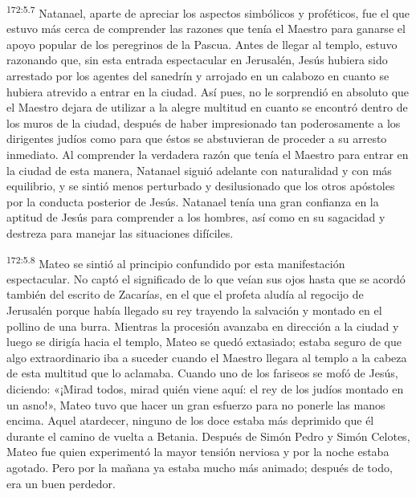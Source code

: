 \par
\textsuperscript{172:5.7} Natanael, aparte de apreciar los aspectos simbólicos y proféticos, fue el que estuvo más cerca de comprender las razones que tenía el Maestro para ganarse el apoyo popular de los peregrinos de la Pascua. Antes de llegar al templo, estuvo razonando que, sin esta entrada espectacular en Jerusalén, Jesús hubiera sido arrestado por los agentes del sanedrín y arrojado en un calabozo en cuanto se hubiera atrevido a entrar en la ciudad. Así pues, no le sorprendió en absoluto que el Maestro dejara de utilizar a la alegre multitud en cuanto se encontró dentro de los muros de la ciudad, después de haber impresionado tan poderosamente a los dirigentes judíos como para que éstos se abstuvieran de proceder a su arresto inmediato. Al comprender la verdadera razón que tenía el Maestro para entrar en la ciudad de esta manera, Natanael siguió adelante con naturalidad y con más equilibrio, y se sintió menos perturbado y desilusionado que los otros apóstoles por la conducta posterior de Jesús. Natanael tenía una gran confianza en la aptitud de Jesús para comprender a los hombres, así como en su sagacidad y destreza para manejar las situaciones difíciles.

\par
\textsuperscript{172:5.8} Mateo se sintió al principio confundido por esta manifestación espectacular. No captó el significado de lo que veían sus ojos hasta que se acordó también del escrito de Zacarías, en el que el profeta aludía al regocijo de Jerusalén porque había llegado su rey trayendo la salvación y montado en el pollino de una burra. Mientras la procesión avanzaba en dirección a la ciudad y luego se dirigía hacia el templo, Mateo se quedó extasiado; estaba seguro de que algo extraordinario iba a suceder cuando el Maestro llegara al templo a la cabeza de esta multitud que lo aclamaba. Cuando uno de los fariseos se mofó de Jesús, diciendo: «¡Mirad todos, mirad quién viene aquí: el rey de los judíos montado en un asno!», Mateo tuvo que hacer un gran esfuerzo para no ponerle las manos encima. Aquel atardecer, ninguno de los doce estaba más deprimido que él durante el camino de vuelta a Betania. Después de Simón Pedro y Simón Celotes, Mateo fue quien experimentó la mayor tensión nerviosa y por la noche estaba agotado. Pero por la mañana ya estaba mucho más animado; después de todo, era un buen perdedor.

